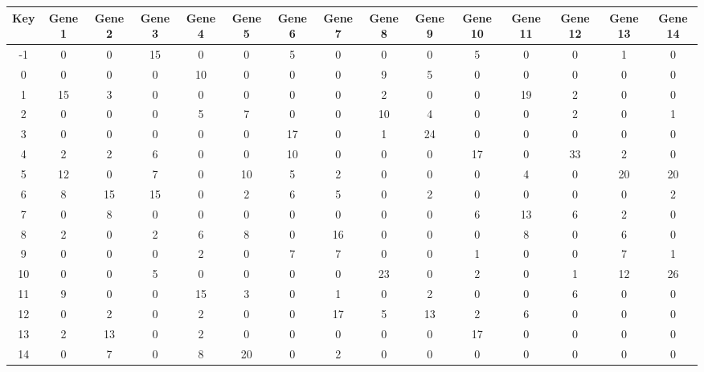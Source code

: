 \begin{tabular}{|c|c|c|c|c|c|c|c|c|c|c|c|c|c|c|}
\hline
Key & Gene 1 & Gene 2 & Gene 3 & Gene 4 & Gene 5 & Gene 6 & Gene 7 & Gene 8 & Gene 9 & Gene 10 & Gene 11 & Gene 12 & Gene 13 & Gene 14 \\
\hline
-1 & 0 & 0 & 15 & 0 & 0 & 5 & 0 & 0 & 0 & 5 & 0 & 0 & 1 & 0 \\
0 & 0 & 0 & 0 & 10 & 0 & 0 & 0 & 9 & 5 & 0 & 0 & 0 & 0 & 0 \\
1 & 15 & 3 & 0 & 0 & 0 & 0 & 0 & 2 & 0 & 0 & 19 & 2 & 0 & 0 \\
2 & 0 & 0 & 0 & 5 & 7 & 0 & 0 & 10 & 4 & 0 & 0 & 2 & 0 & 1 \\
3 & 0 & 0 & 0 & 0 & 0 & 17 & 0 & 1 & 24 & 0 & 0 & 0 & 0 & 0 \\
4 & 2 & 2 & 6 & 0 & 0 & 10 & 0 & 0 & 0 & 17 & 0 & 33 & 2 & 0 \\
5 & 12 & 0 & 7 & 0 & 10 & 5 & 2 & 0 & 0 & 0 & 4 & 0 & 20 & 20 \\
6 & 8 & 15 & 15 & 0 & 2 & 6 & 5 & 0 & 2 & 0 & 0 & 0 & 0 & 2 \\
7 & 0 & 8 & 0 & 0 & 0 & 0 & 0 & 0 & 0 & 6 & 13 & 6 & 2 & 0 \\
8 & 2 & 0 & 2 & 6 & 8 & 0 & 16 & 0 & 0 & 0 & 8 & 0 & 6 & 0 \\
9 & 0 & 0 & 0 & 2 & 0 & 7 & 7 & 0 & 0 & 1 & 0 & 0 & 7 & 1 \\
10 & 0 & 0 & 5 & 0 & 0 & 0 & 0 & 23 & 0 & 2 & 0 & 1 & 12 & 26 \\
11 & 9 & 0 & 0 & 15 & 3 & 0 & 1 & 0 & 2 & 0 & 0 & 6 & 0 & 0 \\
12 & 0 & 2 & 0 & 2 & 0 & 0 & 17 & 5 & 13 & 2 & 6 & 0 & 0 & 0 \\
13 & 2 & 13 & 0 & 2 & 0 & 0 & 0 & 0 & 0 & 17 & 0 & 0 & 0 & 0 \\
14 & 0 & 7 & 0 & 8 & 20 & 0 & 2 & 0 & 0 & 0 & 0 & 0 & 0 & 0 \\
\hline
\end{tabular}